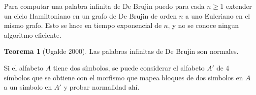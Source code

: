 \documentclass{report}
\theoremstyle{definition} %
\newtheorem{theorem}{Teorema}
\begin{document}
Para computar una palabra infinita de De Brujin puedo para cada $n \geq 1$
extender un ciclo Hamiltoniano en un grafo de De Brujin de orden $n$ a uno
Euleriano en el mismo grafo. Esto se hace en tiempo exponencial de $n$, y no se
conoce ningun algoritmo eficiente.

\begin{theorem}[Ugalde 2000]
    Las palabras infinitas de De Brujin son normales.

    Si el alfabeto $A$ tiene dos símbolos, se puede considerar el alfabeto $A'$
    de 4 símbolos que se obtiene con el morfismo que mapea bloques de dos
    simbolos en $A$ a un simbolo en $A'$ y probar normalidad ahí.
\end{theorem}
\end{document}
